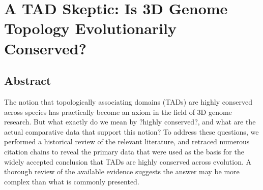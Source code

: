 \chapter{A TAD Skeptic: Is 3D Genome Topology Evolutionarily Conserved?}\label{ch:TADreview}

\section[Abstract]{Abstract\footnotemark}

The notion that topologically associating domains (TADs) are highly conserved across species has practically become an axiom in the field of 3D genome research. But what exactly do we mean by ?highly conserved?, and what are the actual comparative data that support this notion? To address these questions, we performed a historical review of the relevant literature, and retraced numerous citation chains to reveal the primary data that were used as the basis for the widely accepted conclusion that TADs are highly conserved across evolution. A thorough review of the available evidence suggests the answer may be more complex than what is commonly presented.



